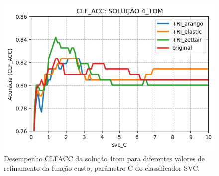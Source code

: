 \begin{figure}[ht]
    \centering
    \caption{Desempenho CLF\underscore{}ACC da solução 4\underscore{}tom para diferentes valores de refinamento da função custo, parâmetro C do classificador SVC.}
    \vspace{-0.5cm}
    \begin{center}
        \includegraphics[scale=0.75]{img/clf-acc-4-tom.png}
    \end{center}
    \vspace{-0.5cm}
    \label{fig:clf-acc-4-tom}
\end{figure}